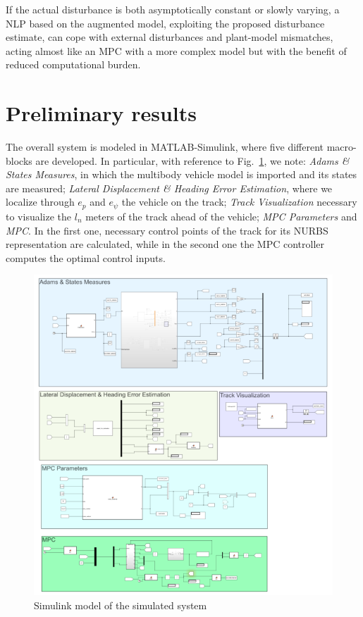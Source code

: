 \documentclass[conference]{IEEEtran} %
\begin{document}
If the actual disturbance is both asymptotically constant or slowly varying, a NLP based on the augmented model, exploiting the proposed disturbance estimate, can cope with external disturbances and plant-model mismatches, acting almost like an MPC with a more complex model but with the benefit of reduced computational burden.



\section{Preliminary results}
The overall system is modeled in MATLAB-Simulink, where five different macro-blocks are developed. In particular, with reference to Fig.~\ref{fig:simulink_blocks}, we note: \textit{Adams \& States Measures}, in which the multibody vehicle model is imported and its states are measured; \textit{Lateral Displacement \& Heading Error Estimation}, where we localize through $e_p$ and $e_\psi$ the vehicle on the track; \textit{Track Visualization} necessary to visualize the $l_n$ meters of the track ahead of the vehicle; \textit{MPC Parameters} and \textit{MPC}. In the first one, necessary control points of the track for its NURBS~\cite{nurbs} representation are calculated, while in the second one the MPC controller computes the optimal control inputs.
\begin{figure}[htb] \centering
	\includegraphics[width=1.\linewidth]{simulink_blocks}
	\caption{Simulink model of the simulated system}
	\label{fig:simulink_blocks}
\end{figure}
\end{document}
